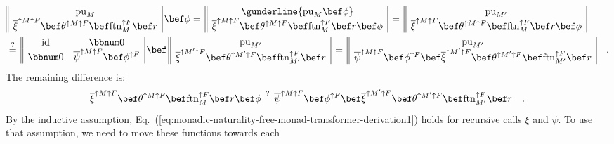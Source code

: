 \begin{align*}
 & \begin{array}{||c|}
\text{pu}_{M}\\
\overline{\xi}^{\uparrow M\uparrow F}\bef\theta^{\uparrow M\uparrow F}\bef\text{ftn}_{M}^{\uparrow F}\bef r
\end{array}\,\bef\phi=\,\begin{array}{||c|}
\gunderline{\text{pu}_{M}\bef\phi}\\
\overline{\xi}^{\uparrow M\uparrow F}\bef\theta^{\uparrow M\uparrow F}\bef\text{ftn}_{M}^{\uparrow F}\bef r\bef\phi
\end{array}\,=\,\begin{array}{||c|}
\text{pu}_{M^{\prime}}\\
\overline{\xi}^{\uparrow M\uparrow F}\bef\theta^{\uparrow M\uparrow F}\bef\text{ftn}_{M}^{\uparrow F}\bef r\bef\phi
\end{array}\\
 & \overset{?}{=}\,\begin{array}{||cc|}
\text{id} & \bbnum 0\\
\bbnum 0 & \overline{\psi}^{\uparrow M\uparrow F}\bef\phi^{\uparrow F}
\end{array}\,\bef\,\begin{array}{||c|}
\text{pu}_{M^{\prime}}\\
\overline{\xi}^{\uparrow M^{\prime}\uparrow F}\bef\theta^{\uparrow M^{\prime}\uparrow F}\bef\text{ftn}_{M^{\prime}}^{\uparrow F}\bef r
\end{array}\,=\,\begin{array}{||c|}
\text{pu}_{M^{\prime}}\\
\overline{\psi}^{\uparrow M\uparrow F}\bef\phi^{\uparrow F}\bef\overline{\xi}^{\uparrow M^{\prime}\uparrow F}\bef\theta^{\uparrow M^{\prime}\uparrow F}\bef\text{ftn}_{M^{\prime}}^{\uparrow F}\bef r
\end{array}\quad.
\end{align*}
The remaining difference is:
\[
\overline{\xi}^{\uparrow M\uparrow F}\bef\theta^{\uparrow M\uparrow F}\bef\text{ftn}_{M}^{\uparrow F}\bef r\bef\phi\overset{?}{=}\overline{\psi}^{\uparrow M\uparrow F}\bef\phi^{\uparrow F}\bef\overline{\xi}^{\uparrow M^{\prime}\uparrow F}\bef\theta^{\uparrow M^{\prime}\uparrow F}\bef\text{ftn}_{M^{\prime}}^{\uparrow F}\bef r\quad.
\]
By the inductive assumption, Eq.~(\ref{eq:monadic-naturality-free-monad-transformer-derivation1})
holds for recursive calls $\overline{\xi}$ and $\overline{\psi}$.
To use that assumption, we need to move these functions towards each
